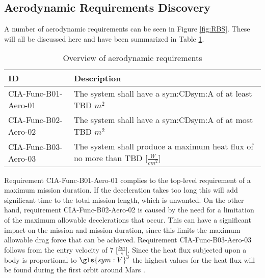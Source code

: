 \subsection{Aerodynamic Requirements Discovery} 
\label{sec:aero}
A number of aerodynamic requirements can be seen in Figure \ref{fig:RBS}. These will all be discussed here and have been summarized in Table \ref{tab:aeroreqs}. 


\begin{table}[h]
	\caption{Overview of aerodynamic requirements}
	\label{tab:aeroreqs}
	\begin{tabular}{|p{}|p{}|}
		\hline
		ID & Description \\
		\hline \hline
		CIA-Func-B01-Aero-01 & The system shall have a \gls{sym:CD}\gls{sym:A} of at least TBD $m^{2}$ \\ \hline
		CIA-Func-B02-Aero-02 & The system shall have a \gls{sym:CD}\gls{sym:A} of at most TBD $m^{2}$ \\ \hline
		CIA-Func-B03-Aero-03 & The system shall produce a maximum heat flux of no more than TBD [$\frac{W}{cm^{2}}$] \\ \hline
	\end{tabular}
\end{table}
Requirement CIA-Func-B01-Aero-01 complies to the top-level requirement of a maximum mission duration. If the deceleration takes too long this will add significant time to the total mission length, which is unwanted.
On the other hand, requirement CIA-Func-B02-Aero-02 is caused by the need for a limitation of the maximum allowable decelerations that occur. This can have a significant impact on the mission and mission duration, since this limits the maximum allowable drag force that can be achieved.
Requirement CIA-Func-B03-Aero-03 follows from the entry velocity of 7 [$\frac{km}{s}$]. Since the heat flux subjected upon a body is proportional to $\gls{sym:V}^{3}$ the highest values for the heat flux will be found during the first orbit around Mars \cite{Tauber1986}.